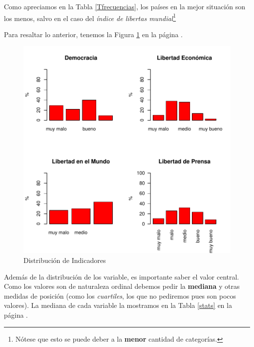 \documentclass{article}
\begin{document}
Como apreciamos en la Tabla \ref{Tfrecuencias}, los países en la mejor situación son los menos, salvo en el caso del \emph{índice de libertas mundial}\footnote{Nótese que esto se puede deber a la {\bf menor} cantidad de categorías.}

\clearpage

Para resaltar lo anterior, tenemos la Figura \ref{barplots} en la página \pageref{barplots}. 


\begin{figure}[h]
\centering
\includegraphics{paperVersion_4-barplots}
\caption{Distribución de Indicadores}
\label{barplots}
\end{figure}

Además de la distribución de los variable, es importante saber el valor central. Como los valores son de naturaleza ordinal debemos pedir la {\bf mediana} y otras medidas de posición (como los \emph{cuartiles}, los que no pediremos pues son pocos valores). La mediana de cada variable la mostramos en la Tabla \ref{stats} en la página \pageref{stats}.
\end{document}

